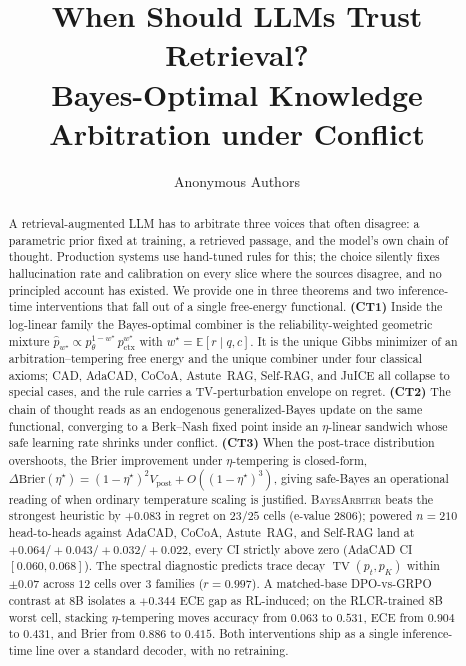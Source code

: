 \documentclass{article}
\title{When Should LLMs Trust Retrieval?\\
       Bayes-Optimal Knowledge Arbitration under Conflict}
\author{%
  Anonymous Authors%
}
\theoremstyle{definition}
\newcommand{\TV}{\operatorname{TV}}
\newcommand{\E}{\mathbb{E}}
\newcommand{\ctx}{\mathrm{ctx}}
\begin{document}
\maketitle

\begin{abstract}
A retrieval-augmented LLM has to arbitrate three voices that often disagree: a parametric prior fixed at training, a retrieved passage, and the model's own chain of thought. Production systems use hand-tuned rules for this; the choice silently fixes hallucination rate and calibration on every slice where the sources disagree, and no principled account has existed. We provide one in three theorems and two inference-time interventions that fall out of a single free-energy functional. \textbf{(CT1)} Inside the log-linear family the Bayes-optimal combiner is the reliability-weighted geometric mixture $\hat p_{w^\star}\!\propto\!p_\theta^{1-w^\star}\,p_{\ctx}^{w^\star}$ with $w^\star\!=\!\E[r\mid q,c]$. It is the unique Gibbs minimizer of an arbitration--tempering free energy and the unique combiner under four classical axioms; CAD, AdaCAD, CoCoA, Astute~RAG, Self-RAG, and JuICE all collapse to special cases, and the rule carries a TV-perturbation envelope on regret. \textbf{(CT2)} The chain of thought reads as an endogenous generalized-Bayes update on the same functional, converging to a Berk--Nash fixed point inside an $\eta$-linear sandwich whose safe learning rate shrinks under conflict. \textbf{(CT3)} When the post-trace distribution overshoots, the Brier improvement under $\eta$-tempering is closed-form, $\Delta\mathrm{Brier}(\eta^\star)\!=\!(1\!-\!\eta^\star)^{2}V_{\mathrm{post}}\!+\!O((1\!-\!\eta^\star)^{3})$, giving safe-Bayes an operational reading of when ordinary temperature scaling is justified. \textsc{BayesArbiter} beats the strongest heuristic by $+0.083$ in regret on $23/25$ cells (e-value $2806$); powered $n\!=\!210$ head-to-heads against AdaCAD, CoCoA, Astute~RAG, and Self-RAG land at $+0.064 / +0.043 / +0.032 / +0.022$, every CI strictly above zero (AdaCAD CI $[0.060,0.068]$). The spectral diagnostic predicts trace decay $\TV(p_t,p_K)$ within $\pm 0.07$ across $12$ cells over $3$ families ($r\!=\!0.997$). A matched-base DPO-vs-GRPO contrast at $8$B isolates a $+0.344$ ECE gap as RL-induced; on the RLCR-trained $8$B worst cell, stacking $\eta$-tempering moves accuracy from $0.063$ to $0.531$, ECE from $0.904$ to $0.431$, and Brier from $0.886$ to $0.415$. Both interventions ship as a single inference-time line over a standard decoder, with no retraining.
\end{abstract}







\clearpage
{\small


}

\appendix
\clearpage
\onecolumn


\clearpage

\end{document}
